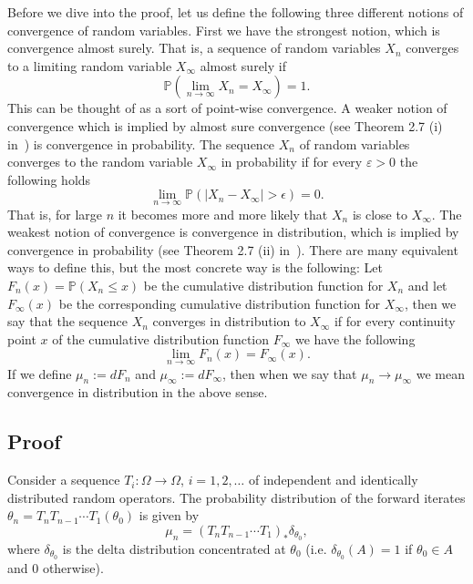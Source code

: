 \documentclass[10pt]{article} %
\renewcommand{\P}{\mathbb{P}}
\theoremstyle{plain}
\theoremstyle{definition}
\theoremstyle{remark}
\begin{document}
Before we dive into the proof, let us define the following three different notions of convergence of random variables. First we have the strongest notion, which is convergence almost surely. That is, a sequence of random variables $X_n$ converges to a limiting random variable $X_\infty$ almost surely if
\begin{equation*}
    \P(\lim_{n \to \infty} X_n = X_\infty) = 1.
\end{equation*}
This can be thought of as a sort of point-wise convergence.
A weaker notion of convergence which is implied by almost sure convergence (see Theorem 2.7 (i) in~\citet{vandervaart}) is convergence in probability.
The sequence $X_n$ of random variables converges to the random variable $X_\infty$ in probability if for every $\varepsilon > 0$ the following holds
\begin{equation*}
    \lim_{n \to \infty} \P(|X_n - X_\infty| > \epsilon) = 0.
\end{equation*}
That is, for large $n$ it becomes more and more likely that $X_n$ is close to $X_\infty$.
The weakest notion of convergence is convergence in distribution, which is implied by convergence in probability (see Theorem 2.7 (ii) in~\citet{vandervaart}).
There are many equivalent ways to define this, but the most concrete way is the following: Let $F_n(x) = \P(X_n \leq x)$ be the cumulative distribution function for $X_n$ and let $F_\infty(x)$ be the corresponding cumulative distribution function for $X_\infty$,
then we say that the sequence $X_n$ converges in distribution to $X_\infty$ if for every continuity point $x$ of the cumulative distribution function $F_\infty$ we have the following
\begin{equation*}
    \lim_{n \to \infty} F_n(x) = F_\infty(x).
\end{equation*}
If we define $\mu_n := dF_n$ and $\mu_\infty := dF_\infty$, then when we say that $\mu_n \to \mu_\infty$ we mean convergence in distribution in the above sense.

\subsection{Proof}

Consider a sequence $T_i:\Omega \rightarrow \Omega$, $i=1,2, \dots$ of independent and identically distributed random operators. The probability distribution of the forward iterates $\theta_n = T_n T_{n-1}\cdots T_1 (\theta_0)$ is given by 
\[
\mu_n = (T_n T_{n-1}\cdots T_1)_* \delta_{\theta_0},
\]
where $\delta_{\theta_0}$ is the delta distribution concentrated at $\theta_0$ (i.e. $\delta_{\theta_0}(A) = 1$ if $\theta_0\in A$ and 0 otherwise).
\end{document}
